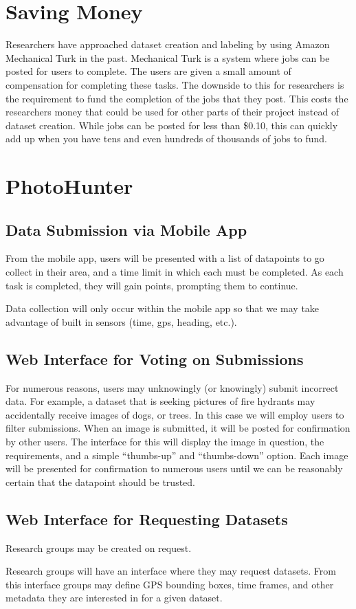 \documentclass{article}
\begin{document}
\section{Saving Money}

Researchers have approached dataset creation and labeling by using 
Amazon Mechanical Turk in the past.  Mechanical Turk is a system where
jobs can be posted for users to complete.  The users are given a small 
amount of compensation for completing these tasks.  The downside to this
for researchers is the requirement to fund the completion of the jobs
that they post.  This costs the researchers money that could be used
for other parts of their project instead of dataset creation.  While jobs
can be posted for less than \$0.10, this can quickly add up when you have
tens and even hundreds of thousands of jobs to fund.

\section{PhotoHunter}

\subsection{Data Submission via Mobile App}

From the mobile app, users will be presented with a list of datapoints
to go collect in their area, and a time limit in which each must be
completed. As each task is completed, they will gain points, prompting
them to continue.

Data collection will only occur within the mobile app so that we may
take advantage of built in sensors (time, gps, heading, etc.).

\subsection{Web Interface for Voting on Submissions}

For numerous reasons, users may unknowingly (or knowingly) submit
incorrect data. For example, a dataset that is seeking pictures of
fire hydrants may accidentally receive images of dogs, or trees. In
this case we will employ users to filter submissions. When an image is
submitted, it will be posted for confirmation by other users. The
interface for this will display the image in question, the
requirements, and a simple ``thumbs-up'' and ``thumbs-down'' option.
Each image will be presented for confirmation to numerous users until
we can be reasonably certain that the datapoint should be trusted.

\subsection{Web Interface for Requesting Datasets}

Research groups may be created on request. 

Research groups will have an interface where they may request
datasets. From this interface groups may define GPS bounding boxes,
time frames, and other metadata they are interested in for a given
dataset.
\end{document}

